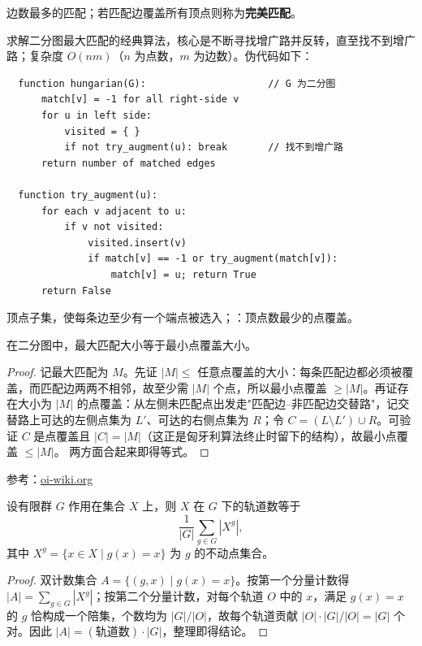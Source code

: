 \documentclass[12pt]{article}
\begin{document}
\begin{defn}[最大匹配]
  边数最多的匹配；若匹配边覆盖所有顶点则称为\textbf{完美匹配}。
\end{defn}

\begin{defn}
  求解二分图最大匹配的经典算法，核心是不断寻找增广路并反转，直至找不到增广路；复杂度 $O(nm)$（$n$ 为点数，$m$ 为边数）。伪代码如下：
  \begin{verbatim}
  function hungarian(G):                     // G 为二分图
      match[v] = -1 for all right-side v
      for u in left side:
          visited = { }
          if not try_augment(u): break       // 找不到增广路
      return number of matched edges

  function try_augment(u):
      for each v adjacent to u:
          if v not visited:
              visited.insert(v)
              if match[v] == -1 or try_augment(match[v]):
                  match[v] = u; return True
      return False
  \end{verbatim}
\end{defn}

\begin{defn}
  顶点子集，使每条边至少有一个端点被选入；：顶点数最少的点覆盖。
\end{defn}

\begin{thm}[König 定理]
  在二分图中，最大匹配大小等于最小点覆盖大小。
\end{thm}
\begin{proof}
  记最大匹配为 $M$。先证 $|M|\le$ 任意点覆盖的大小：每条匹配边都必须被覆盖，而匹配边两两不相邻，故至少需 $|M|$ 个点，所以最小点覆盖 $\ge|M|$。再证存在大小为 $|M|$ 的点覆盖：从左侧未匹配点出发走"匹配边--非匹配边交替路"，记交替路上可达的左侧点集为 $L'$、可达的右侧点集为 $R$；令 $C=(L\setminus L')\cup R$。可验证 $C$ 是点覆盖且 $|C|=|M|$（这正是匈牙利算法终止时留下的结构），故最小点覆盖 $\le|M|$。  两方面合起来即得等式。
\end{proof}

参考：\href{https://oi-wiki.org}{oi-wiki.org}
\begin{lem}[Burnside 引理]
  设有限群 $G$ 作用在集合 $X$ 上，则 $X$ 在 $G$ 下的轨道数等于
  \[
    \frac{1}{|G|}\sum_{g\in G} |X^g|,
  \]
  其中 $X^g=\{x\in X\mid g(x)=x\}$ 为 $g$ 的不动点集合。
\end{lem}
\begin{proof}
  双计数集合 $A=\{(g,x)\mid g(x)=x\}$。按第一个分量计数得 $|A|=\sum_{g\in G}|X^g|$；按第二个分量计数，对每个轨道 $O$ 中的 $x$，满足 $g(x)=x$ 的 $g$ 恰构成一个陪集，个数均为 $|G|/|O|$，故每个轨道贡献 $|O|\cdot |G|/|O|=|G|$ 个对。因此 $|A|=(\text{轨道数})\cdot|G|$，整理即得结论。
\end{proof}
\end{document}
